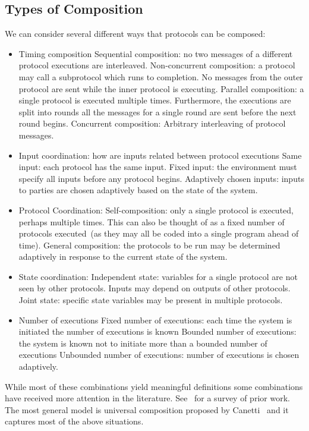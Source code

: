 \documentclass{article}
\begin{document}
\subsection{Types of Composition}
We can consider several different ways that protocols can be composed:
\begin{itemize}
\item Timing composition
\subitem Sequential composition: no two messages of a different protocol executions are interleaved.
\subitem Non-concurrent composition: a protocol may call a subprotocol which runs to completion.  No messages from the outer protocol are sent while the inner protocol is executing.
\subitem Parallel composition: a single protocol is executed multiple times.  Furthermore, the executions are split into rounds all the messages for a single round are sent before the next round begins.
\subitem Concurrent composition: Arbitrary interleaving of protocol messages.
\item Input coordination: how are inputs related between protocol executions
\subitem Same input: each protocol has the same input.
\subitem Fixed input: the environment must specify all inputs before any protocol begins.
\subitem Adaptively chosen inputs: inputs to parties are chosen adaptively based on the state of the system.
\item Protocol Coordination:
\subitem Self-composition: only a single protocol is executed, perhaps multiple times.  This can also be thought of as a fixed number of protocols executed~(as they may all be coded into a single program ahead of time).
\subitem General composition: the protocols to be run may be determined adaptively in response to the current state of the system.
\item State coordination:
\subitem Independent state: variables for a single protocol are not seen by other protocols.  Inputs may depend on outputs of other protocols.
\subitem Joint state: specific state variables may be present in multiple protocols.
\item Number of executions
\subitem Fixed number of executions: each time the system is initiated the number of executions is known
\subitem Bounded number of executions: the system is known not to initiate more than a bounded number of executions
\subitem Unbounded number of executions: number of executions is chosen adaptively.
\end{itemize}
While most of these combinations yield meaningful definitions some combinations have received more attention in the literature.  See~\cite{canettiTutorial} for a survey of prior work.  The most general model is universal composition proposed by Canetti~\cite{canettiUC} and it captures most of the above situations.
\end{document}
